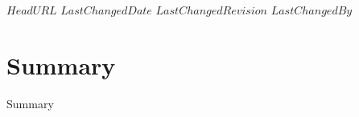 \svnidlong
{$HeadURL$}
{$LastChangedDate$}
{$LastChangedRevision$}
{$LastChangedBy$}
\section{Summary}
Summary
